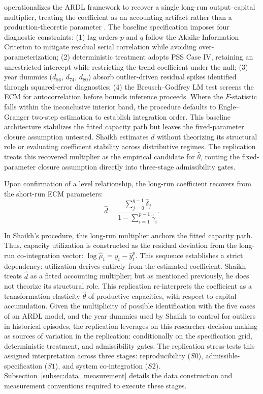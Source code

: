 \documentclass[11pt]{article}
\begin{document}
\citet{Shaikh2016} operationalizes the ARDL framework to recover a single long-run output--capital multiplier, treating the coefficient as an accounting artifact rather than a production-theoretic parameter \citep[Appendix~6.7]{Shaikh2016}. The baseline specification imposes four diagnostic constraints: (1) lag orders $p$ and $q$ follow the Akaike Information Criterion to mitigate residual serial correlation while avoiding over-parameterization; (2) deterministic treatment adopts PSS Case IV, retaining an unrestricted intercept while restricting the trend coefficient under the null; (3) year dummies ($d_{56}$, $d_{74}$, $d_{80}$) absorb outlier-driven residual spikes identified through squared-error diagnostics; (4) the Breusch--Godfrey LM test screens the ECM for autocorrelation before bounds inference proceeds. Where the $F$-statistic falls within the inconclusive interior band, the procedure defaults to Engle--Granger two-step estimation to establish integration order. This baseline architecture stabilizes the fitted capacity path but leaves the fixed-parameter closure assumption untested. Shaikh estimates $d$ without theorizing its structural role or evaluating coefficient stability across distributive regimes. The replication treats this recovered multiplier as the empirical candidate for $\hat{\theta}$, routing the fixed-parameter closure assumption directly into three-stage admissibility gates.

Upon confirmation of a level relationship, the long-run coefficient recovers from the short-run ECM parameters:
\begin{equation}
\hat{d} = \frac{\sum_{j=0}^{q-1} \hat{\delta}_j}{1 - \sum_{i=1}^{p-1} \hat{\gamma}_i}.
\end{equation}

In Shaikh's procedure, this long-run multiplier anchors the fitted capacity path. Thus, capacity utilization is constructed as the residual deviation from the long-run co-integration vector: $\log \hat{\mu}_t = y_t - \hat{y}^p_t$. This sequence establishes a strict dependency: utilization derives entirely from the estimated coefficient. Shaikh treats $\hat{d}$ as a fitted accounting multiplier; but as mentioned previously, he does not theorize its structural role. This replication re-interprets the coefficient as a transformation elasticity $\hat{\theta}$ of productive capacities, with respect to capital accumulation. Given the multiplicity of possible identification with the five cases of an ARDL model, and the year dummies used by Shaikh to control for outliers in historical episodes, the replication leverages on this researcher-decision making as sources of variation in the replication: conditionally on the specification grid, deterministic treatment, and admissibility gates. The replication stress-tests this assigned interpretation across three stages: reproducibility ($S0$), admissible-specification ($S1$), and system co-integration ($S2$). Subsection~\ref{subsec:data_measurement} details the data construction and measurement conventions required to execute these stages.
\end{document}
